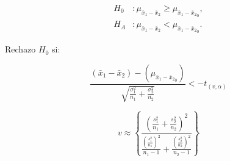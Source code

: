 		\begin{minipage}[b]{\textwidth}
    \begin{minipage}[c]{0.3 \textwidth}\item
    	\begin{align*}
    	H_0&: \mu _{ \bar { x } _{ 1 }-\bar { x } _{ 2 }} \ge \mu _{ \bar { x } _{ 1 }-\bar { x } _{ 2 }}_0,\\
    	H_A&: \mu _{ \bar { x } _{ 1 }-\bar { x } _{ 2 }} < \mu _{ \bar { x } _{ 1 }-\bar { x } _{ 2 }}_0.    	
    	\end{align*}\end{minipage} \hfill
    \begin{minipage}[c]{0.3 \textwidth}\item
				Rechazo $H_0$ si:		
		\end{minipage} \hfill
    \begin{minipage}[c]{0.3 \textwidth}\item
	 $$\frac {( \bar{x}_1-\bar{x}_2)-(\mu _{ \bar { x } _{ 1 }-\bar { x } _{ 2 }}_0 )}{\sqrt{\frac { \sigma^ 2_1 }{n_1} +\frac { \sigma^ 2_2 }{n_2}}  }< -t_{(v,\alpha)}$$
    \end{minipage}
    \end{minipage}
    
$$
v\approx \left\{ \frac { \left( \frac { s^{ 2 }_{ 1 } }{ n_{ 1 } } +\frac { s^{ 2 }_{ 2 } }{ n_{ 2 } }  \right) ^{ 2 } }{ \frac { \left( \frac { s^{ 2 }_{ 1 } }{ n_{ 1 } }  \right) ^{ 2 } }{ n_{ 1 }-1 } +\frac { \left( \frac { s^{ 2 }_{ 2 } }{ n_{ 2 } }  \right) ^{ 2 } }{ n_{ 2 }-1 }  }  \right\} 

$$  